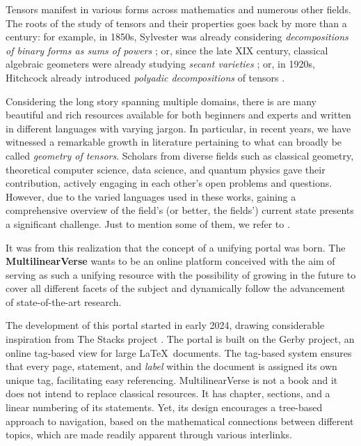 Tensors manifest in various forms across mathematics and numerous other fields. The roots of the study of tensors and their properties goes back by more than a century: for example, in 1850s, Sylvester was already considering {\it decompositions of binary forms as sums of powers} \cite{Syl51}; or, since the late XIX century, classical algebraic geometers were already studying {\it secant varieties} \cite{Sco08,Ter11}; or, in 1920s, Hitchcock already introduced {\it polyadic decompositions} of tensors \cite{Hit27}.

Considering the long story spanning multiple domains, there is are many beautiful and rich resources available for both beginners and experts and written in different languages with varying jargon. In particular, in recent years, we have witnessed a remarkable growth in literature pertaining to what can broadly be called \emph{geometry of tensors}. Scholars from diverse fields such as classical geometry, theoretical computer science, data science, and quantum physics gave their contribution, actively engaging in each other's open problems and questions. However, due to the varied languages used in these works, gaining a comprehensive overview of the field's (or better, the fields') current state presents a significant challenge. Just to mention some of them, we refer to \cite{Zak93,Ger96,IK99,Hac12,Lan12,CGO14,Rus16,BCCGO18,BBCMM19}. 

It was from this realization that the concept of a unifying portal was born. The \textbf{MultilinearVerse} wants to be an online platform conceived with the aim of serving as such a unifying resource with the possibility of growing in the future to cover all different facets of the subject and dynamically follow the advancement of state-of-the-art research.

The development of this portal started in early 2024, drawing considerable inspiration from The Stacks project \cite{Stacks}. The portal is built on the Gerby project, an online tag-based view for large \LaTeX~documents. The tag-based system ensures that every page, statement, and \emph{label} within the document is assigned its own unique tag, facilitating easy referencing. MultilinearVerse is not a book and it does not intend to replace classical resources. It has chapter, sections, and a linear numbering of its statements. Yet, its design encourages a tree-based approach to navigation, based on the mathematical connections between different topics, which are made readily apparent through various interlinks.


